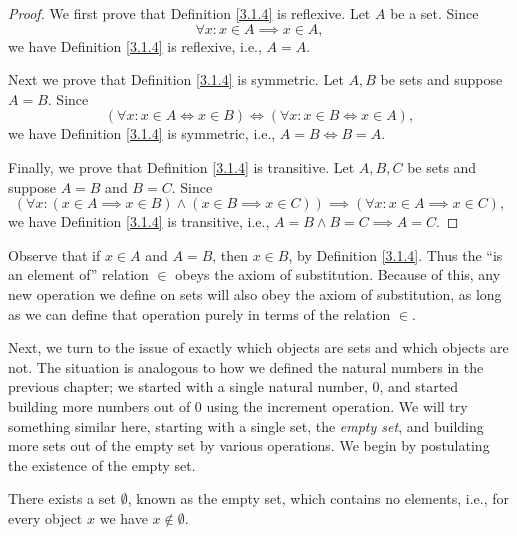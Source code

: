 \begin{proof}
    We first prove that Definition \ref{3.1.4} is reflexive.
    Let \(A\) be a set.
    Since
    \[
        \forall x : x \in A \implies x \in A,
    \]
    we have Definition \ref{3.1.4} is reflexive, i.e., \(A = A\).

    Next we prove that Definition \ref{3.1.4} is symmetric.
    Let \(A, B\) be sets and suppose \(A = B\).
    Since
    \[
        (\forall x : x \in A \iff x \in B) \iff (\forall x : x \in B \iff x \in A),
    \]
    we have Definition \ref{3.1.4} is symmetric, i.e., \(A = B \iff B = A\).

    Finally, we prove that Definition \ref{3.1.4} is transitive.
    Let \(A, B, C\) be sets and suppose \(A = B\) and \(B = C\).
    Since
    \[
        (\forall x : (x \in A \implies x \in B) \land (x \in B \implies x \in C)) \implies (\forall x : x \in A \implies x \in C),
    \]
    we have Definition \ref{3.1.4} is transitive, i.e., \(A = B \land B = C \implies A = C\).
\end{proof}

\begin{note}
    Observe that if \(x \in A\) and \(A = B\), then \(x \in B\), by Definition \ref{3.1.4}.
    Thus the ``is an element of'' relation \(\in\) obeys the axiom of substitution.
    Because of this, any new operation we define on sets will also obey the axiom of substitution, as long as we can define that operation purely in terms of the relation \(\in\).
\end{note}

\begin{note}
    Next, we turn to the issue of exactly which objects are sets and which objects are not.
    The situation is analogous to how we defined the natural numbers in the previous chapter;
    we started with a single natural number, \(0\), and started building more numbers out of \(0\) using the increment operation.
    We will try something similar here, starting with a single set, the \emph{empty set},
    and building more sets out of the empty set by various operations.
    We begin by postulating the existence of the empty set.
\end{note}

\begin{axiom}\label{3.2}
    There exists a set \(\emptyset\), known as the empty set, which contains no elements, i.e., for every object \(x\) we have \(x \notin \emptyset\).
\end{axiom}

